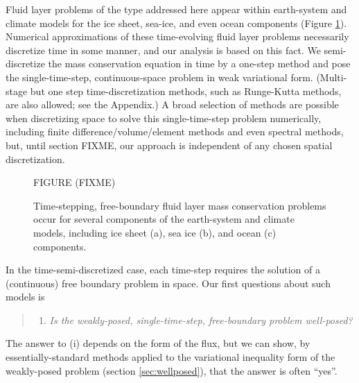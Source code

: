 \documentclass[final,leqno,onefignum,onetabnum]{siamltex1213bueler}
\begin{document}
Fluid layer problems of the type addressed here appear within earth-system and climate models for the ice sheet, sea-ice, and even ocean components (Figure \ref{fig:climatepictures}).  Numerical approximations of these time-evolving fluid layer problems necessarily discretize time in some manner, and our analysis is based on this fact.  We semi-discretize the mass conservation equation in time by a one-step method and pose the single-time-step, continuous-space problem in weak variational form.  (Multi-stage but one step time-discretization methods, such as Runge-Kutta methods, are also allowed; see the Appendix.)  A broad selection of methods are possible when discretizing space to solve this single-time-step problem numerically, including finite difference/volume/element methods and even spectral methods, but, until section FIXME, our approach is independent of any chosen spatial discretization.

\begin{figure}[ht]
\begin{center}
FIGURE (FIXME)
\end{center}
\caption{Time-stepping, free-boundary fluid layer mass conservation problems occur for several components of the earth-system and climate models, including ice sheet (a), sea ice (b), and ocean (c) components.}
\label{fig:climatepictures}
\end{figure}

In the time-semi-discretized case, each time-step requires the solution of a (continuous) free boundary problem in space.  Our first questions about such models is
  \begin{quote}
  \renewcommand{\labelenumi}{(\roman{enumi})}
  \begin{enumerate}
  \item \emph{Is the weakly-posed, single-time-step, free-boundary problem well-posed?}
  \end{enumerate}
  \end{quote}
The answer to (i) depends on the form of the flux, but we can show, by essentially-standard methods applied to the variational inequality form of the weakly-posed problem (section \ref{sec:wellposed}), that the answer is often ``yes''.
\end{document}
